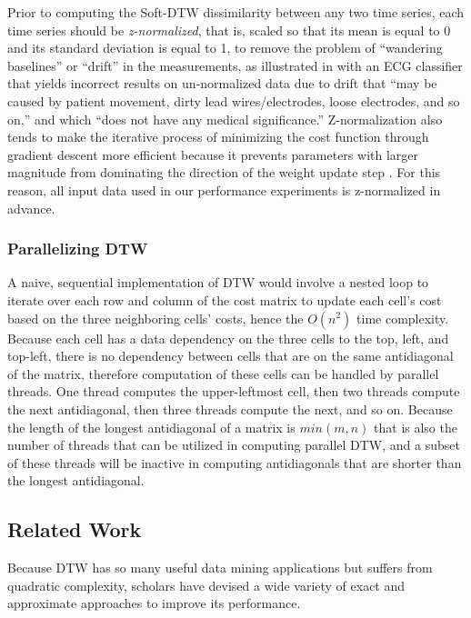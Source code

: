 \documentclass[12pt, letterpaper]{article}
\begin{document}
Prior to computing the Soft-DTW dissimilarity between any two time series, each
time series should be \emph{z-normalized}, that is, scaled so that its mean is
equal to 0 and its standard deviation is equal to 1, to remove the problem of
``wandering baselines'' or ``drift'' in the measurements, as illustrated in
\cite{rakthanmanon_addressing_2013} with an ECG classifier that yields incorrect
results on un-normalized data due to drift that ``may be caused by patient
movement, dirty lead wires/electrodes, loose electrodes, and so on,'' and which
``does not have any medical significance.'' Z-normalization also tends to make
the iterative process of minimizing the cost function through gradient descent
more efficient because it prevents parameters with larger magnitude from
dominating the direction of the weight update step
\cite{jordan_normalizing_2018}. For this reason, all input data used in our
performance experiments is z-normalized in advance.

\subsubsection{Parallelizing DTW}

A naive, sequential implementation of DTW would involve a nested loop to iterate
over each row and column of the cost matrix to update each cell's cost based on
the three neighboring cells' costs, hence the $O(n^2)$ time complexity. Because
each cell has a data dependency on the three cells to the top, left, and
top-left, there is no dependency between cells that are on the same antidiagonal
of the matrix, therefore computation of these cells can be handled by parallel
threads. One thread computes the upper-leftmost cell, then two threads compute
the next antidiagonal, then three threads compute the next, and so on. Because
the length of the longest antidiagonal of a matrix is $min(m,n)$ that is also
the number of threads that can be utilized in computing parallel DTW, and a
subset of these threads will be inactive in computing antidiagonals that are
shorter than the longest antidiagonal.

\subsection{Related Work}

Because DTW has so many useful data mining applications but suffers from
quadratic complexity, scholars have devised a wide variety of exact and
approximate approaches to improve its performance.
\end{document}
